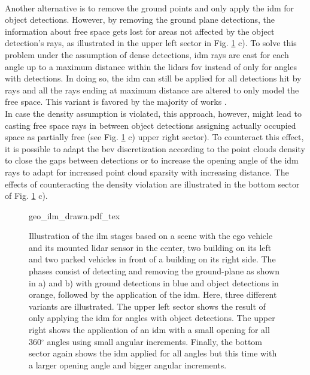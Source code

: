 \\
Another alternative is to remove the ground points and only apply the \gls{idm} for object detections. However, by removing the ground plane detections, the information about free space gets lost for areas not affected by the object detection's rays, as illustrated in the upper left sector in Fig. \ref{fig:geo_ilm_drawn} c). To solve this problem under the assumption of dense detections, \gls{idm} rays are cast for each angle up to a maximum distance within the lidars \gls{fov} instead of only for angles with detections. In doing so, the \gls{idm} can still be applied for all detections hit by rays and all the rays ending at maximum distance are altered to only model the free space. This variant is favored by the majority of works \cite{thrun2006stanley,narksri2018slope,fischler1981random,hough1962method,oliveira2016scene,tian2020fast}.
\\
In case the density assumption is violated, this approach, however, might lead to casting free space rays in between object detections assigning actually occupied space as partially free (see Fig. \ref{fig:geo_ilm_drawn} c) upper right sector). To counteract this effect, it is possible to adapt the \gls{bev} discretization according to the point clouds density to close the gaps between detections or to increase the opening angle of the \gls{idm} rays to adapt for increased point cloud sparsity with increasing distance. The effects of counteracting the density violation are illustrated in the bottom sector of Fig. \ref{fig:geo_ilm_drawn} c).  
\begin{figure}
	\begin{center}
		{geo_ilm_drawn.pdf_tex}
		\caption{\label{fig:geo_ilm_drawn}Illustration of the \gls{ilm} stages based on a scene with the ego vehicle and its mounted lidar sensor in the center, two building on its left and two parked vehicles in front of a building on its right side. The phases consist of detecting and removing the ground-plane as shown in a) and b) with ground detections in blue and object detections in orange, followed by the application of the \gls{idm}. Here, three different variants are illustrated. The upper left sector shows the result of only applying the \gls{idm} for angles with object detections. The upper right shows the application of an \gls{idm} with a small opening for all 360$^\circ$ angles using small angular increments. Finally, the bottom sector again shows the \gls{idm} applied for all angles but this time with a larger opening angle and bigger angular increments.}
	\end{center}
\end{figure} 
%

